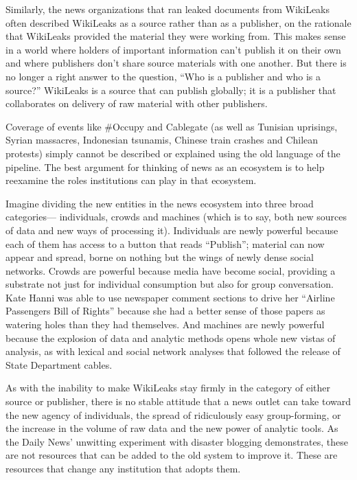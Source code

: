 Similarly, the news organizations that ran leaked documents from WikiLeaks
often described WikiLeaks as a source rather than as a publisher, on the rationale
that WikiLeaks provided the material they were working from. This makes sense
in a world where holders of important information can’t publish it on their own
and where publishers don’t share source materials with one another. But there
is no longer a right answer to the question, ``Who is a publisher and who is a
source?'' WikiLeaks is a source that can publish globally; it is a publisher that collaborates
on delivery of raw material with other publishers.

Coverage of events like #Occupy and Cablegate (as well as Tunisian uprisings,
Syrian massacres, Indonesian tsunamis, Chinese train crashes and Chilean protests)
simply cannot be described or explained using the old language of the
pipeline. The best argument for thinking of news as an ecosystem is to help reexamine
the roles institutions can play in that ecosystem.

Imagine dividing the new entities in the news ecosystem into three broad categories—
individuals, crowds and machines (which is to say, both new sources of
data and new ways of processing it). Individuals are newly powerful because each
of them has access to a button that reads ``Publish''; material can now appear and
spread, borne on nothing but the wings of newly dense social networks. Crowds
are powerful because media have become social, providing a substrate not just for
individual consumption but also for group conversation. Kate Hanni was able to
use newspaper comment sections to drive her ``Airline Passengers Bill of Rights''
because she had a better sense of those papers as watering holes than they had
themselves. And machines are newly powerful because the explosion of data and
analytic methods opens whole new vistas of analysis, as with lexical and social
network analyses that followed the release of State Department cables.

As with the inability to make WikiLeaks stay firmly in the category of either
source or publisher, there is no stable attitude that a news outlet can take toward
the new agency of individuals, the spread of ridiculously easy group-forming,
or the increase in the volume of raw data and the new power of analytic tools.
As the Daily News’ unwitting experiment with disaster blogging demonstrates,
these are not resources that can be added to the old system to improve it. These
are resources that change any institution that adopts them.

